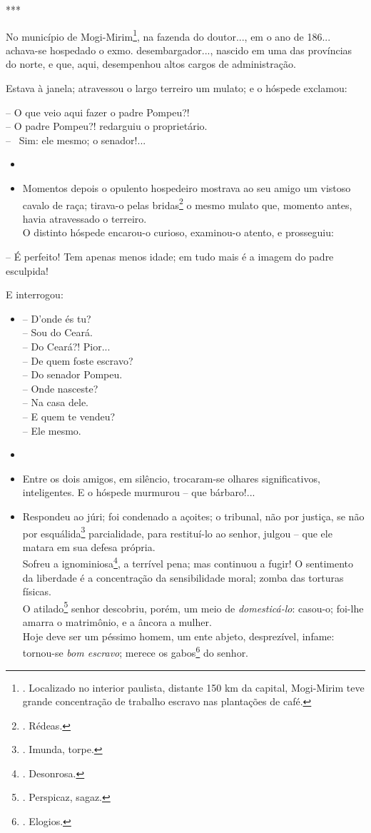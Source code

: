 ***

No município de Mogi-Mirim\footnote{. Localizado no interior paulista,
  distante 150 km da capital, Mogi-Mirim teve grande concentração de
  trabalho escravo nas plantações de café.}, na fazenda do doutor..., em
o ano de 186... achava-se hospedado o exmo. desembargador..., nascido em
uma das províncias do norte, e que, aqui, desempenhou altos cargos de
administração.

Estava à janela; atravessou o largo terreiro um mulato; e o hóspede
exclamou:

-- O que veio aqui fazer o padre Pompeu?!\\
-- O padre Pompeu?! redarguiu o proprietário.\\
-- ~Sim: ele mesmo; o senador!...

\begin{itemize}
\item
\item
  Momentos depois o opulento hospedeiro mostrava ao seu amigo um vistoso
  cavalo de raça; tirava-o pelas bridas\footnote{. Rédeas.} o mesmo
  mulato que, momento antes, havia atravessado o terreiro.\\
  O distinto hóspede encarou-o curioso, examinou-o atento, e prosseguiu:
\end{itemize}

-- É perfeito! Tem apenas menos idade; em tudo mais é a imagem do padre
esculpida!

E interrogou:

\begin{itemize}
\item
  -- D'onde és tu?\\
  -- Sou do Ceará.\\
  -- Do Ceará?! Pior...\\
  -- De quem foste escravo?\\
  -- Do senador Pompeu.\\
  -- Onde nasceste?\\
  -- Na casa dele.\\
  -- E quem te vendeu?\\
  -- Ele mesmo.
\item
\item
  Entre os dois amigos, em silêncio, trocaram-se olhares significativos,
  inteligentes. E o hóspede murmurou -- que bárbaro!...
\item
  Respondeu ao júri; foi condenado a açoites; o tribunal, não por
  justiça, se não por esquálida\footnote{. Imunda, torpe.} parcialidade,
  para restituí-lo ao senhor, julgou -- que ele matara em sua defesa
  própria.\\
  Sofreu a ignominiosa\footnote{. Desonrosa.}, a terrível pena; mas
  continuou a fugir! O sentimento da liberdade é a concentração da
  sensibilidade moral; zomba das torturas físicas.\\
  O atilado\footnote{. Perspicaz, sagaz.} senhor descobriu, porém, um
  meio de \emph{domesticá-lo}: casou-o; foi-lhe amarra o matrimônio, e a
  âncora a mulher.\\
  Hoje deve ser um péssimo homem, um ente abjeto, desprezível, infame:
  tornou-se \emph{bom escravo}; merece os gabos\footnote{. Elogios.} do
  senhor.
\end{itemize}

